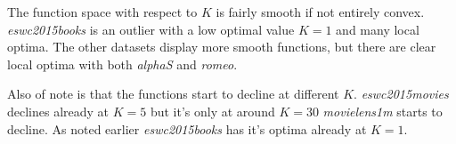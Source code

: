 
\FloatBarrier

The function space with respect to $K$ is fairly smooth if not entirely convex. \textit{eswc2015books} is an outlier with a low optimal value $K = 1$ and many local optima. The other datasets display more smooth functions, but there are clear local optima with both \textit{alphaS} and \textit{romeo}.

Also of note is that the functions start to decline at different $K$. \textit{eswc2015movies} declines already at $K = 5$ but it's only at around $K = 30$ \textit{movielens1m} starts to decline. As noted earlier \textit{eswc2015books} has it's optima already at $K = 1$.

